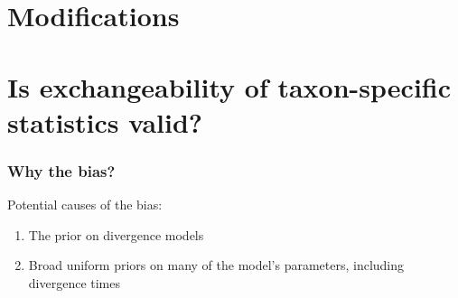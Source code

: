 \section{Modifications}
\section{Is exchangeability of taxon-specific statistics valid?}



\begin{frame}
    \frametitle{Why the bias?}
    Potential causes of the bias:
    \begin{enumerate}
        \item The prior on divergence models
        \item Broad uniform priors on many of the model's parameters, including
            divergence times
    \end{enumerate}
\end{frame}

